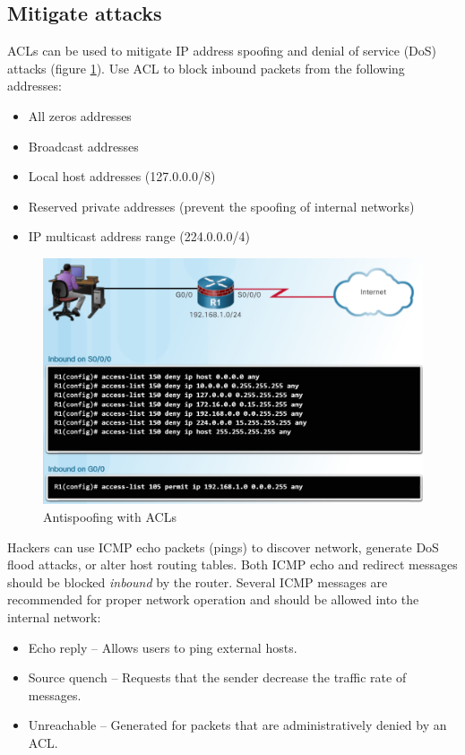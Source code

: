 \subsection{Mitigate attacks}

ACLs can be used to mitigate IP address spoofing and denial of service (DoS) attacks (figure \ref{AntispoofingACL}). Use ACL to block inbound packets from the following addresses:

\begin{itemize}
\item All zeros addresses
\item Broadcast addresses
\item Local host addresses (127.0.0.0/8)
\item Reserved private addresses (prevent the spoofing of internal networks)
\item IP multicast address range (224.0.0.0/4)
\end{itemize}

\begin{figure}[hbtp]
  \caption{Antispoofing with ACLs}\label{AntispoofingACL}
  \centering
  \includegraphics[width=10\xm]{pictures/AntispoofingACL.PNG}
  \end{figure}

Hackers can use ICMP echo packets (pings) to discover network, generate DoS flood attacks, or alter host routing tables. Both ICMP echo and redirect messages should be blocked \emph{inbound} by the router. Several ICMP messages are recommended for proper network operation and should be allowed into the internal network:

\begin{itemize}
\item Echo reply -- Allows users to ping external hosts.
\item Source quench -- Requests that the sender decrease the traffic rate of messages.
\item Unreachable -- Generated for packets that are administratively denied by an ACL.
\end{itemize}


